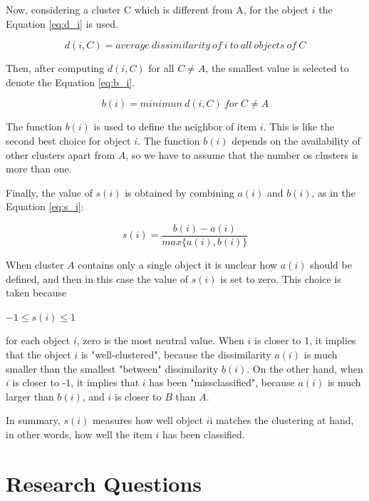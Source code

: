 \documentclass[journal]{IEEEtran}
\begin{document}
Now, considering a cluster C which is different from A, for the object $i$ the Equation \ref{eq:d_i} is used.

\begin{equation} \label{eq:d_i}
d(i, C) = average~dissimilarity~of~i~to~all~objects~of~C
\end{equation}

Then, after computing $d(i, C)$ for all $C \neq A$, the smallest value is selected to denote the Equation \ref{eq:b_i}.

\begin{equation} \label{eq:b_i}
b(i) = minimun~d(i, C)~for~C \neq A
\end{equation}

The function $b(i)$ is used to define the neighbor of item $i$. This is like the second best choice for object $i$. The function $b(i)$ depends on the availability of other clusters apart from $A$, so we have to assume that the number os clusters is more than one.

Finally, the value of $s(i)$ is obtained by combining $a(i)$ and $b(i)$, as in the Equation \ref{eq:s_i}:

\begin{equation} \label{eq:s_i}
s(i) = \frac{b(i) - a(i)}{max\{a(i), b(i)\}}
\end{equation}

When cluster $A$ contains only a single object it is unclear how $a(i)$ should be defined, and then in this case the value of $s(i)$ is set to zero. This choice is taken because
\begin{center}
$-1 \le s(i) \le 1$
\end{center}

for each object $i$, zero is the most neutral value. When $i$ is closer to 1, it implies that the object $i$ is "well-clustered", because the dissimilarity $a(i)$ is much smaller than the smallest "between" dissimilarity $b(i)$. On the other hand, when $i$ is closer to -1, it implies that $i$ has been "missclassified", because $a(i)$ is much larger than $b(i)$, and $i$ is closer to $B$ than $A$.

In summary, $s(i)$ measures how well object $i$i matches the clustering at hand, in other words, how well the item $i$ has been classified.

\section{Research Questions} \label{sec:research-questions}
\end{document}
